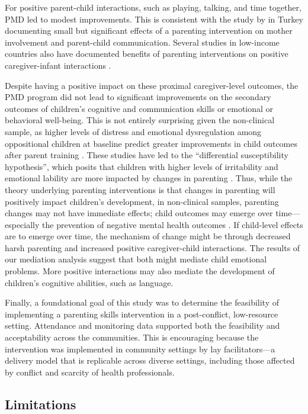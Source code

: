 \documentclass[12pt,authoryear]{elsarticle}\usepackage{knitr}
\begin{document}
For positive parent-child interactions, such as playing, talking, and time together, PMD led to modest improvements. This is consistent with the study by \citet{Kagitcibasi:2001} in Turkey documenting small but significant effects of a parenting intervention on mother involvement and parent-child communication. Several studies in low-income countries also have documented benefits of parenting interventions on positive caregiver-infant interactions \citep{Knerr:2013,Aboud2009}.

  Despite having a positive impact on these proximal caregiver-level outcomes, the PMD program did not lead to significant improvements on the secondary outcomes of children's cognitive and communication skills or emotional or behavioral well-being. This is not entirely surprising given the non-clinical sample, as higher levels of distress and emotional dysregulation among oppositional children at baseline predict greater improvements in child outcomes after parent training \citep{Scott:2012}. These studies have led to the ``differential susceptibility hypothesis'', which posits that children with higher levels of irritability and emotional lability are more impacted by changes in parenting \citep{Bakermans-Kranenburg:2008,Scott:2012}. Thus, while the theory underlying parenting interventions is that changes in parenting will positively impact children's development, in non-clinical samples, parenting changes may not have immediate effects; child outcomes may emerge over time---especially the prevention of negative mental health outcomes \citep{Hermanns:2013}. If child-level effects are to emerge over time, the mechanism of change might be through decreased harsh parenting and increased positive caregiver-child interactions. The results of our mediation analysis suggest that both might mediate child emotional problems. More positive interactions may also mediate the development of children's cognitive abilities, such as language. 

Finally, a foundational goal of this study was to determine the feasibility of implementing a parenting skills intervention in a post-conflict, low-resource setting. Attendance and monitoring data supported both the feasibility and acceptability across the communities. This is encouraging because the intervention was implemented in community settings by lay facilitators---a delivery model that is replicable across diverse settings, including those affected by conflict and scarcity of health professionals. 

\subsection*{Limitations}
\end{document}
